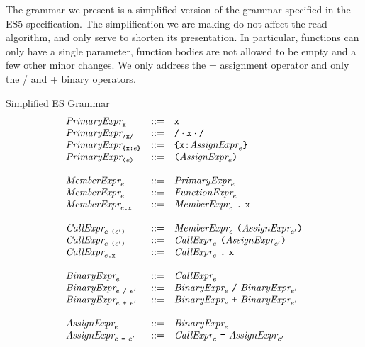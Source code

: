 \documentclass[preprint,10pt]{sigplanconf}
\begin{document}
The grammar we present is a simplified version of the grammar
specified in the ES5 specification. The simplification we are making
do not affect the read algorithm, and only serve to shorten its
presentation. In particular, functions can only have a single
parameter, function bodies are not allowed to be empty and a few other
minor changes. We only address the = assignment operator and only the
/ and + binary operators.

\begin{displayfigure*}{\label{fig:grammar}Simplified ES Grammar}
\[
\begin{array}{lcl}
  \textit{PrimaryExpr}_{\texttt{x}} &::=& \texttt{x} 
  \\
  \textit{PrimaryExpr}_{\texttt{/x/}} &::=& \texttt{/} \cdot \texttt{x} \cdot \texttt{/} 
  \\
  \textit{PrimaryExpr}_{\texttt{\{}\texttt{x} \texttt{:} e\texttt{\}}} &::=& 
  \texttt{\{}\texttt{x} \texttt{:} \textit{AssignExpr}_{e}\texttt{\}}
  \\
  \textit{PrimaryExpr}_{\texttt{(}e\texttt{)}} &::=& 
  \texttt{(}\textit{AssignExpr}_{e}\texttt{)}
  \\ \\
  \textit{MemberExpr}_{e} &::=&
  \textit{PrimaryExpr}_{e}
  \\
  \textit{MemberExpr}_{e} &::=&
  \textit{FunctionExpr}_{e}
  \\
  \textit{MemberExpr}_{e\texttt{.\texttt{x}}} &::=&
  \textit{MemberExpr}_{e}~\texttt{.}~\texttt{x}
  \\ \\
  \textit{CallExpr}_{e~\texttt{(}e'\texttt{)}} &::=& 
  \textit{MemberExpr}_{e}~
  \texttt{(}\textit{AssignExpr}_{e'}\texttt{)}
  \\
  \textit{CallExpr}_{e~\texttt{(}e'\texttt{)}} &::=& 
  \textit{CallExpr}_{e}~
  \texttt{(}\textit{AssignExpr}_{e'}\texttt{)}
  \\
  \textit{CallExpr}_{e\texttt{.\texttt{x}}} &::=& 
  \textit{CallExpr}_{e}~\texttt{.}~
  \texttt{x}
  \\ \\
  \textit{BinaryExpr}_{e} &::=& \textit{CallExpr}_{e} \\
  \textit{BinaryExpr}_{e ~\texttt{/}~ e'}
  &::=&
  \textit{BinaryExpr}_{e} ~\texttt{/}~ \textit{BinaryExpr}_{e'} \\
  \textit{BinaryExpr}_{e ~\texttt{+}~ e'}
  &::=&
  \textit{BinaryExpr}_{e} ~\texttt{+}~ \textit{BinaryExpr}_{e'}
  \\ \\
  \textit{AssignExpr}_{e} &::=&
  \textit{BinaryExpr}_{e}
  \\
  \textit{AssignExpr}_{e~\texttt{=}~e'} &::=&
  \textit{CallExpr}_{e}~\texttt{=}~
  \textit{AssignExpr}_{e'}
  \\ \\

\end{array}\]
\end{displayfigure*}
\end{document}

